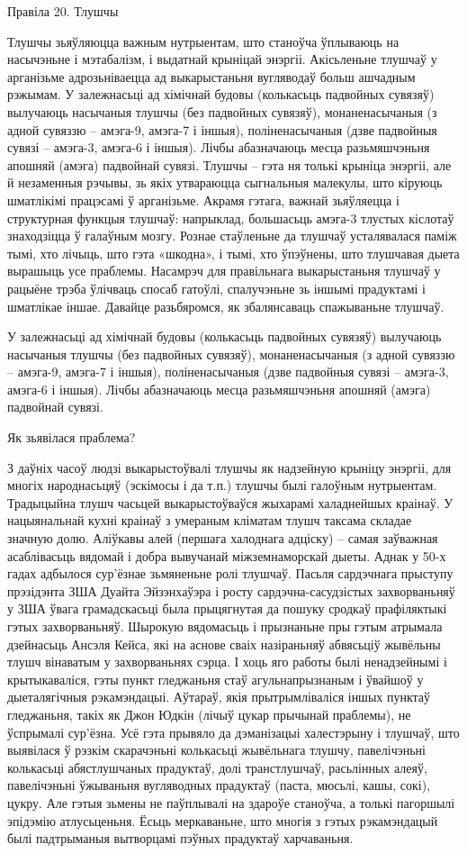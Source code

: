 Правіла 20. Тлушчы

Тлушчы зьяўляюцца важным нутрыентам, што станоўча ўплываюць на насычэньне і мэтабалізм, і выдатнай крыніцай энэргіі. Акісьленьне тлушчаў у арганізьме адрозьніваецца ад выкарыстаньня вугляводаў больш ашчадным рэжымам. У залежнасьці ад хімічнай будовы (колькасьць падвойных сувязяў) вылучаюць насычаныя тлушчы (без падвойных сувязяў), монаненасычаныя (з адной сувяззю – амэга-9, амэга-7 і іншыя), поліненасычаныя (дзве падвойныя сувязі – амэга-3, амэга-6 і іншыя). Лічбы абазначаюць месца разьмяшчэньня апошняй (амэга) падвойнай сувязі. Тлушчы – гэта ня толькі крыніца энэргіі, але й незаменныя рэчывы, зь якіх утвараюцца сыгнальныя малекулы, што кіруюць шматлікімі працэсамі ў арганізьме. Акрамя гэтага, важнай зьяўляецца і структурная функцыя тлушчаў: напрыклад, большасьць амэга-3 тлустых кіслотаў знаходзіцца ў галаўным мозгу.
Рознае стаўленьне да тлушчаў усталявалася паміж тымі, хто лічыць, што гэта «шкодна», і тымі, хто ўпэўнены, што тлушчавая дыета вырашыць усе праблемы. Насамрэч для правільнага выкарыстаньня тлушчаў у рацыёне трэба ўлічваць спосаб гатоўлі, спалучэньне зь іншымі прадуктамі і шматлікае іншае. Давайце разьбяромся, як збалянсаваць спажываньне тлушчаў.

У залежнасьці ад хімічнай будовы (колькасьць падвойных сувязяў) вылучаюць насычаныя тлушчы (без падвойных сувязяў), монаненасычаныя (з адной сувяззю – амэга-9, амэга-7 і іншыя), поліненасычаныя (дзве падвойныя сувязі – амэга-3, амэга-6 і іншыя). Лічбы абазначаюць месца разьмяшчэньня апошняй (амэга) падвойнай сувязі.

Як зьявілася праблема?

З даўніх часоў людзі выкарыстоўвалі тлушчы як надзейную крыніцу энэргіі, для многіх народнасьцяў (эскімосы і да т.п.) тлушчы былі галоўным нутрыентам. Традыцыйна тлушч часьцей выкарыстоўваўся жыхарамі халаднейшых краінаў. У нацыянальнай кухні краінаў з умераным кліматам тлушч таксама складае значную долю. Аліўкавы алей (першага халоднага адціску) – самая заўважная асаблівасьць вядомай і добра вывучанай міжземнаморскай дыеты.
Аднак у 50-х гадах адбылося сур'ёзнае зьмяненьне ролі тлушчаў. Пасьля сардэчнага прыступу прэзідэнта ЗША Дуайта Эйзэнхаўэра і росту сардэчна-сасудзістых захворваньняў у ЗША ўвага грамадскасьці была прыцягнутая да пошуку сродкаў прафіляктыкі гэтых захворваньняў. Шырокую вядомасьць і прызнаньне пры гэтым атрымала дзейнасьць Ансэля Кейса, які на аснове сваіх назіраньняў абвясьціў жывёльны тлушч вінаватым у захворваньнях сэрца. І хоць яго работы былі ненадзейнымі і крытыкаваліся, гэты пункт гледжаньня стаў агульнапрызнаным і ўвайшоў у дыеталягічныя рэкамэндацыі. Аўтараў, якія прытрымліваліся іншых пунктаў гледжаньня, такіх як Джон Юдкін (лічыў цукар прычынай праблемы), не ўспрымалі сур'ёзна. Усё гэта прывяло да дэманізацыі халестэрыну і тлушчаў, што выявілася ў рэзкім скарачэньні колькасьці жывёльнага тлушчу, павелічэньні колькасьці абястлушчаных прадуктаў, долі транстлушчаў, расьлінных алеяў, павелічэньні ўжываньня вугляводных прадуктаў (паста, мюсьлі, кашы, сокі), цукру. Але гэтыя зьмены не паўплывалі на здароўе станоўча, а толькі пагоршылі эпідэмію атлусьценьня. Ёсьць меркаваньне, што многія з гэтых рэкамэндацый былі падтрыманыя вытворцамі пэўных прадуктаў харчаваньня.

